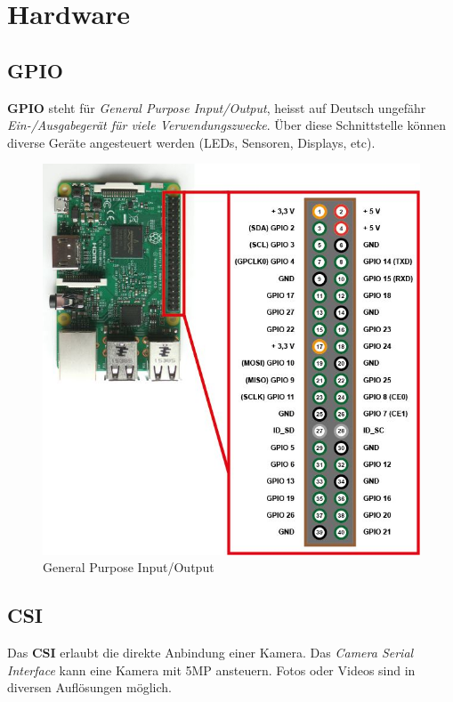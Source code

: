 \documentclass[12pt,a4paper]{article}
\begin{document}
\section{Hardware}

\subsection{GPIO}

\textbf{GPIO} steht für \textit{General Purpose Input/Output}, heisst auf Deutsch ungefähr \textit{Ein-/Ausgabegerät für viele Verwendungszwecke}. Über diese Schnittstelle können diverse Geräte angesteuert werden (LEDs, Sensoren, Displays, etc).

\begin{figure}[H]
\centering
\includegraphics[scale=.5]{gpio}
\caption{General Purpose Input/Output}
\label{fig:gpio}
\end{figure}

\subsection{CSI}

Das \textbf{CSI} erlaubt die direkte Anbindung einer Kamera. Das \textit{Camera Serial Interface} kann eine Kamera mit 5MP ansteuern. Fotos oder Videos sind in diversen Auflösungen möglich.
\end{document}
